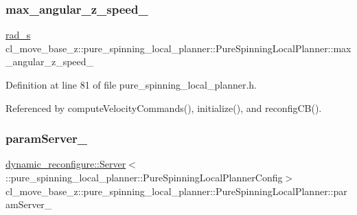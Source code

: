 \subsubsection{\texorpdfstring{max\+\_\+angular\+\_\+z\+\_\+speed\+\_\+}{max\_angular\_z\_speed\_}}
{\footnotesize\ttfamily \hyperlink{pure__spinning__local__planner_8h_a76bf9d2bc75b779e3418b2320c652037}{rad\+\_\+s} cl\+\_\+move\+\_\+base\+\_\+z\+::pure\+\_\+spinning\+\_\+local\+\_\+planner\+::\+Pure\+Spinning\+Local\+Planner\+::max\+\_\+angular\+\_\+z\+\_\+speed\+\_\+\hspace{0.3cm}{\ttfamily [private]}}



Definition at line 81 of file pure\+\_\+spinning\+\_\+local\+\_\+planner.\+h.



Referenced by compute\+Velocity\+Commands(), initialize(), and reconfig\+C\+B().

\mbox{\label{classcl__move__base__z_1_1pure__spinning__local__planner_1_1PureSpinningLocalPlanner_a5e91943cf4500d35199004a09cc09ca4}} 
\subsubsection{\texorpdfstring{param\+Server\+\_\+}{paramServer\_}}
{\footnotesize\ttfamily \hyperlink{strikes__back_2servers_2led__action__server_2src_2led__action__server__node_8cpp_a2036ae39d23f8e14a2cc8ddcd46dea5a}{dynamic\+\_\+reconfigure\+::\+Server}$<$\+::pure\+\_\+spinning\+\_\+local\+\_\+planner\+::\+Pure\+Spinning\+Local\+Planner\+Config$>$ cl\+\_\+move\+\_\+base\+\_\+z\+::pure\+\_\+spinning\+\_\+local\+\_\+planner\+::\+Pure\+Spinning\+Local\+Planner\+::param\+Server\+\_\+\hspace{0.3cm}{\ttfamily [private]}}



